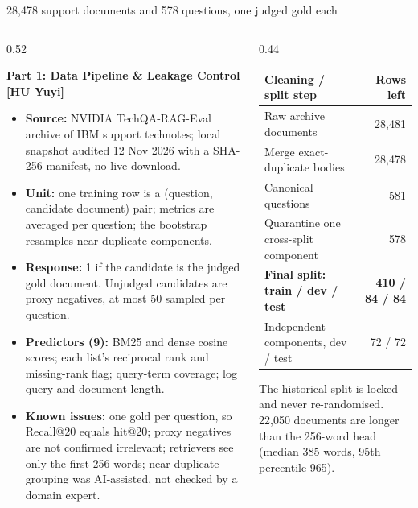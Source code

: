 \documentclass[aspectratio=169,10pt,xcolor=table]{beamer}
\newcommand{\spk}{}
\newcommand{\speakername}{HU Yuyi}
\newcommand{\sect}[1]{{\small\bfseries\color{ink}#1\par}\vspace{2pt}}
\newcommand{\fnote}[1]{{\tiny\color{muted}#1\par}}
\begin{document}
\renewcommand{\speakername}{HU Yuyi (60159701)}
\renewcommand{\spk}{0:45}
\begin{frame}{28,478 support documents and 578 questions, one judged gold each}
\begin{columns}[T,onlytextwidth]
\begin{column}{0.52\textwidth}
\sect{Part 1: Data Pipeline \& Leakage Control [HU Yuyi]}
\begin{itemize}
\item \textbf{Source:} NVIDIA TechQA-RAG-Eval archive of IBM support technotes; local snapshot audited
  12 Nov 2026 with a SHA-256 manifest, no live download.
\item \textbf{Unit:} one training row is a (question, candidate document) pair; metrics are averaged per
  question; the bootstrap resamples near-duplicate components.
\item \textbf{Response:} 1 if the candidate is the judged gold document. Unjudged candidates are proxy
  negatives, at most 50 sampled per question.
\item \textbf{Predictors (9):} BM25 and dense cosine scores; each list's reciprocal rank and missing-rank
  flag; query-term coverage; log query and document length.
\item \textbf{Known issues:} one gold per question, so Recall@20 equals hit@20; proxy negatives are not
  confirmed irrelevant; retrievers see only the first 256 words; near-duplicate grouping was
  AI-assisted, not checked by a domain expert.
\end{itemize}
\end{column}
\begin{column}{0.44\textwidth}
{\scriptsize\begin{tabular}{@{}p{4.6cm}r@{}}
\toprule
\textbf{Cleaning / split step} & \textbf{Rows left}\\
\midrule
Raw archive documents & 28,481\\
Merge exact-duplicate bodies & 28,478\\
Canonical questions & 581\\
Quarantine one cross-split component & 578\\
\rowcolor{brandsoft}\textbf{Final split: train / dev / test} & \textbf{410 / 84 / 84}\\
Independent components, dev / test & 72 / 72\\
\bottomrule
\end{tabular}\par}
\vspace{4pt}
\fnote{The historical split is locked and never re-randomised. 22,050 documents are longer than the
  256-word head (median 385 words, 95th percentile 965).}
\end{column}
\end{columns}
\end{frame}
\end{document}
